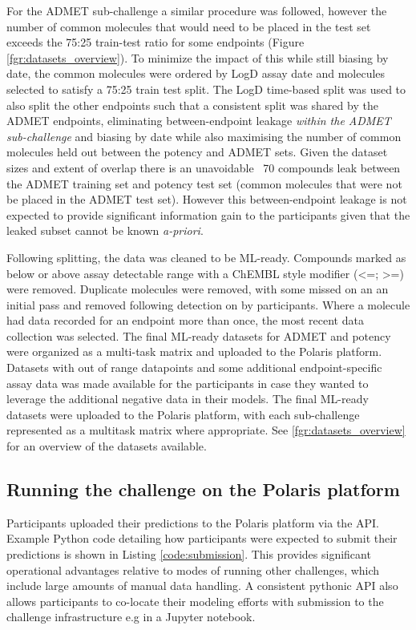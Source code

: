 \documentclass[journal=jcim,manuscript=article]{achemso}
\begin{document}
For the ADMET sub-challenge a similar procedure was followed, however the number of common molecules that would need to be placed in the test set exceeds the 75:25 train-test ratio for some endpoints (Figure \ref{fgr:datasets_overview}). To minimize the impact of this while still biasing by date, the common molecules were ordered by LogD assay date and molecules selected to satisfy a 75:25 train test split. The LogD time-based split was used to also split the other endpoints such that a consistent split was shared by the ADMET endpoints, eliminating between-endpoint leakage \textit{within the ADMET sub-challenge} and biasing by date while also maximising the number of common molecules held out between the potency and ADMET sets. Given the dataset sizes and extent of overlap there is an unavoidable ~70 compounds leak between the ADMET training set and potency test set (common molecules that were not be placed in the ADMET test set). However this between-endpoint leakage is not expected to provide significant information gain to the participants given that the leaked subset cannot be known \textit{a-priori}.

Following splitting, the data was cleaned to be ML-ready. Compounds marked as below or above assay detectable range with a ChEMBL style modifier (\textless=; \textgreater=) were removed. Duplicate molecules were removed, with some missed on an an initial pass and removed following detection on by participants. Where a molecule had data recorded for an endpoint more than once, the most recent data collection was selected. The final ML-ready datasets for ADMET and potency were organized as a multi-task matrix and uploaded to the Polaris platform. Datasets with out of range datapoints and some additional endpoint-specific assay data was made available for the participants in case they wanted to leverage the additional negative data in their models. The final ML-ready datasets were uploaded to the Polaris platform, with each sub-challenge represented as a multitask matrix where appropriate. See \ref{fgr:datasets_overview} for an overview of the datasets available. 


\subsection{Running the challenge on the Polaris platform}

Participants uploaded their predictions to the Polaris platform via the API. Example Python code detailing how participants were expected to submit their predictions is shown in Listing \ref{code:submission}. This provides significant operational advantages relative to modes of running other challenges, which include large amounts of manual data handling. A consistent pythonic API also allows participants to co-locate their modeling efforts with submission to the challenge infrastructure e.g in a Jupyter notebook.
\end{document}
